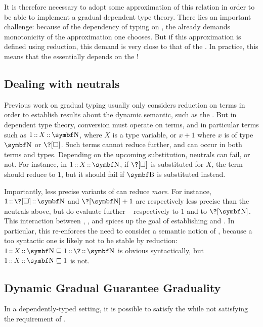It is therefore necessary to adopt some approximation of this relation
in order to be able to implement a gradual dependent type theory.
There lies an important challenge: because of the dependency of typing on ,
the  already demands monotonicity of the approximation
one chooses. But if this approximation is defined using reduction, this demand is
very close to that of the .%
%
In practice, this means that the  essentially depends on the !

\subsection{Dealing with neutrals}
Previous work on gradual typing usually only considers reduction on  terms in order to establish results about the dynamic semantic, such as the .
%
But in dependent type theory, conversion must operate on  terms,
and in particular  terms such as $\asc{\asc{1}{X}}{\Nat}$,
where $X$ is a type variable, or $x + 1$ where $x$ is of type $\Nat$ or $\?[\uni]$.
%
Such  terms cannot reduce further, and can occur in both terms and types.
Depending on the upcoming substitution, neutrals can fail, or not. For instance, in $\asc{\asc{1}{X}}{\Nat}$, if $\?[\uni]$ is substituted for $X$, the term should reduce to $1$,
but it should fail if $\Bool$ is substituted instead.

Importantly, less precise variants of  can reduce \emph{more}.
For instance, $\asc{\asc{1}{\?[\uni]}}{\Nat}$ and $\?[\Nat] + 1$ are respectively
less precise than the neutrals above, but do evaluate further – respectively to $1$
and to $\?[\Nat]$. This interaction between , , and 
spices up the goal of establishing  and .
In particular, this re-enforces the need to consider a semantic notion of ,
because a too syntactic one is likely not to be stable by reduction:
$\asc{\asc{1}{X}}{\Nat} \pre \asc{\asc{1}{\?}}{\Nat}$ is obvious syntactically,
but $\asc{\asc{1}{X}}{\Nat} \pre 1$ is not.

\subsection{Dynamic Gradual Guarantee \vs Graduality}
In a dependently-typed setting, it is possible to satisfy the  while not satisfying the  requirement of .

